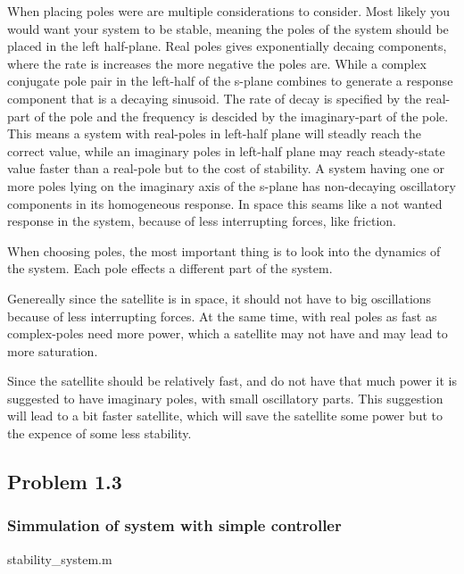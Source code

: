 When placing poles were are multiple considerations to consider. Most likely you would want your system to be stable, meaning the poles of the system should be placed in the left half-plane. Real poles gives exponentially decaing components, where the rate is increases the more negative the poles are. While a complex conjugate pole pair in the left-half of the s-plane combines to generate a response component that is a decaying sinusoid. The rate of decay is specified by the real-part of the pole and the frequency is descided by the imaginary-part of the pole. This means a system with real-poles in left-half plane will steadly reach the correct value, while an imaginary poles in left-half plane may reach steady-state value faster than a real-pole but to the cost of stability. A system having one or more poles lying on the imaginary axis of the s-plane has non-decaying oscillatory components in its homogeneous response. In space this seams like a not wanted response in the system, because of less interrupting forces, like friction. 

When choosing poles, the most important thing is to look into the dynamics of the system. Each pole effects a different part of the system.  

Genereally since the satellite is in space, it should not have to big oscillations because of less interrupting forces. At the same time, with real poles as fast as complex-poles need more power, which a satellite may not have and may lead to more saturation.

Since the satellite should be relatively fast, and do not have that much power it is suggested to have imaginary poles, with small oscillatory parts. This suggestion will lead to a bit faster satellite, which will save the satellite some power but to the expence of some less stability.  

\subsection*{Problem 1.3}
\subsubsection*{Simmulation of system with simple controller}

{\color{blue}  stability\_system.m }




